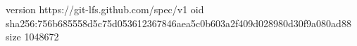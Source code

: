version https://git-lfs.github.com/spec/v1
oid sha256:756b685558d5c75d053612367846aea5c0b603a2f409d028980d30f9a080ad88
size 1048672
